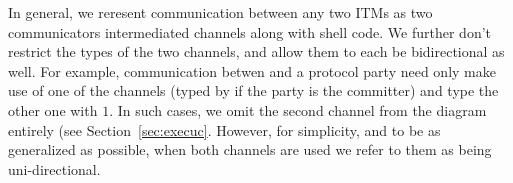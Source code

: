 In general, we reresent communication between any two ITMs as two communicators intermediated channels along with shell code. 
We further don't restrict the types of the two channels, and allow them to each be bidirectional as well.
For example, communication betwen \Fcom and a protocol party need only make use of one of the channels (typed by  if the party is the committer) and type the other one with $1$.
In such cases, we omit the second channel from the diagram entirely (see Section~\ref{sec:execuc}.
However, for simplicity, and to be as generalized as possible, when both channels are used we refer to them as being uni-directional.

%
